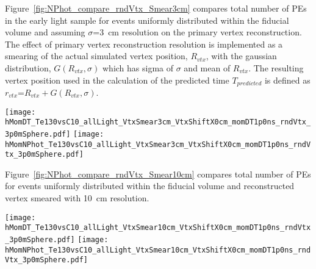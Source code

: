 Figure~\ref{fig:NPhot_compare_rndVtx_Smear3cm} compares total number of PEs in the early light sample for 
events uniformly distributed within the fiducial volume and assuming $\sigma$=3~cm resolution on the primary 
vertex reconstruction. The effect of primary vertex reconstruction resolution is implemented as a smearing of 
the actual simulated vertex position, $R_{vtx}$, with the gaussian distribution, $G(R_{vtx},\sigma)$ 
which has sigma of $\sigma$ and mean of $R_{vtx}$. The resulting vertex position used in the calculation of the
predicted time $T_{predicted}$ is defined as $r_{vtx}$=$R_{vtx} + G(R_{vtx},\sigma)$.

\begin{figure*}[ht]
  \centering
  \texttt{[image: hMomDT\_Te130vsC10\_allLight\_VtxSmear3cm\_VtxShiftX0cm\_momDT1p0ns\_rndVtx\_3p0mSphere.pdf]}
  \texttt{[image: hMomNPhot\_Te130vsC10\_allLight\_VtxSmear3cm\_VtxShiftX0cm\_momDT1p0ns\_rndVtx\_3p0mSphere.pdf]}
  \caption{(Left) Difference between measured PE arrival time and arrival time prediction based on
        vertex location (T$^{predicted} = |r_{hit} - r_{vtx}|/v_{phot}$, where $v_phot = c/1.53$).
        $\vbb$-decay (black solid line) and $\Cten$ events (magenta dashed line) are compared.
        Vertical line at 1~ns indicates cut for early light selection.
        (Right) Total number of PEs in the early light sample.
        $^{10}$C events with energy deposition in the $\pm$10\% energy range around Q-value are
        selected. Verticies are uniformly distributed within the fiducial volume, $R<3$~m.
        {\bf Vetrex is smeared with 3~cm resolution.}}
\label{fig:NPhot_compare_rndVtx_Smear3cm}
\end{figure*}


Figure~\ref{fig:NPhot_compare_rndVtx_Smear10cm} compares total number of PEs for events uniformly
distributed within the fiducial volume and reconstructed vertex smeared with 10~cm resolution.

\begin{figure*}[ht]
  \centering
  \texttt{[image: hMomDT\_Te130vsC10\_allLight\_VtxSmear10cm\_VtxShiftX0cm\_momDT1p0ns\_rndVtx\_3p0mSphere.pdf]}
  \texttt{[image: hMomNPhot\_Te130vsC10\_allLight\_VtxSmear10cm\_VtxShiftX0cm\_momDT1p0ns\_rndVtx\_3p0mSphere.pdf]}
  \caption{(Left) Difference between measured PE arrival time and arrival time prediction based on
        vertex location (T$^{predicted} = |r_{hit} - r_{vtx}|/v_{phot}$, where $v_phot = c/1.53$).
        $\vbb$-decay (black solid line) and $\Cten$ events (magenta dashed line) are compared.
        Vertical line at 1~ns indicates cut for early light selection.
        (Right) Total number of PEs in the early light sample.
        $^{10}$C events with energy deposition in the $\pm$10\% energy range around Q-value are
        selected. Verticies are uniformly distributed within the fiducial volume, $R<3$~m.
        {\bf Vertex is smeared with 10~cm resolution.}}
\label{fig:NPhot_compare_rndVtx_Smear10cm}
\end{figure*}



